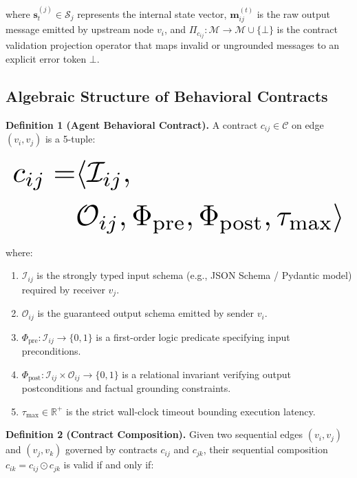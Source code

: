 \documentclass[10pt,twocolumn,letterpaper]{article}
\begin{document}
where $\mathbf{s}_t^{(j)} \in \mathcal{S}_j$ represents the internal state vector, $\mathbf{m}_{ij}^{(t)}$ is the raw output message emitted by upstream node $v_i$, and $\Pi_{c_{ij}}: \mathcal{M} \to \mathcal{M} \cup \{\bot\}$ is the contract validation projection operator that maps invalid or ungrounded messages to an explicit error token $\bot$.


\subsection{Algebraic Structure of Behavioral Contracts}


\textbf{Definition 1 (Agent Behavioral Contract).} A contract $c_{ij} \in \mathcal{C}$ on edge $(v_i, v_j)$ is a 5-tuple:










\begin{equation}
\resizebox{\columnwidth}{!}{$\displaystyle
\begin{aligned}
c_{ij} = & \langle \mathcal{I}_{ij}, \\
& \mathcal{O}_{ij}, \Phi_{\text{pre}}, \Phi_{\text{post}}, \tau_{\max} \rangle
\end{aligned}
$}
\end{equation}










where:
\begin{enumerate}
  \item $\mathcal{I}_{ij}$ is the strongly typed input schema (e.g., JSON Schema / Pydantic model) required by receiver $v_j$.
  \item $\mathcal{O}_{ij}$ is the guaranteed output schema emitted by sender $v_i$.
  \item $\Phi_{\text{pre}}: \mathcal{I}_{ij} \to \{0, 1\}$ is a first-order logic predicate specifying input preconditions.
  \item $\Phi_{\text{post}}: \mathcal{I}_{ij} \times \mathcal{O}_{ij} \to \{0, 1\}$ is a relational invariant verifying output postconditions and factual grounding constraints.
  \item $\tau_{\max} \in \mathbb{R}^+$ is the strict wall-clock timeout bounding execution latency.
\end{enumerate}

\textbf{Definition 2 (Contract Composition).} Given two sequential edges $(v_i, v_j)$ and $(v_j, v_k)$ governed by contracts $c_{ij}$ and $c_{jk}$, their sequential composition $c_{ik} = c_{ij} \odot c_{jk}$ is valid if and only if:
\end{document}
